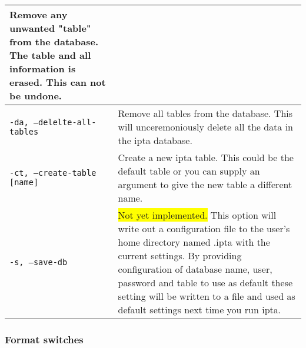 \documentclass[english,twoside,openright,a4paper,12pt]{article}
\newcommand{\hilight}[1]{\colorbox{yellow}{#1}}
\begin{document}
\begin{longtable}{|p{}|p{}|}
Remove any unwanted "table" from the database. The table and all
information is erased. This can not be undone.\\\hline

\texttt{-da, --delelte-all-tables} & 

Remove all tables from the database. This will unceremoniously delete
all the data in the ipta database.\\\hline

\texttt{-ct, --create-table [name]} & 

Create a new ipta table. This could be the default table or you can
supply an argument to give the new table a different name. \\\hline

\texttt{-s, --save-db} & 

\hilight{Not yet implemented.} This option will write out a
configuration file to the user's home directory named .ipta with the
current settings. By providing configuration of database name, user,
password and table to use as default these setting will be written to
a file and used as default settings next time you run ipta.\\\hline
\end{longtable}
\normalsize

\subsubsection{Format switches}
\end{document}
